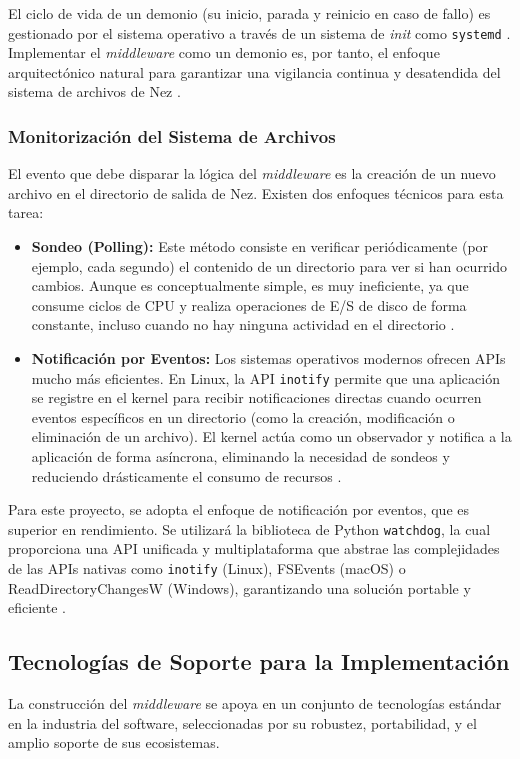 El ciclo de vida de un demonio (su inicio, parada y reinicio en caso de fallo) es gestionado por el sistema operativo a través de un sistema de \textit{init} como \texttt{systemd} \cite{stevens2013advanced}. Implementar el \textit{middleware} como un demonio es, por tanto, el enfoque arquitectónico natural para garantizar una vigilancia continua y desatendida del sistema de archivos de Nez \cite{sanders2005daemon}.

\subsubsection{Monitorización del Sistema de Archivos}
El evento que debe disparar la lógica del \textit{middleware} es la creación de un nuevo archivo en el directorio de salida de Nez. Existen dos enfoques técnicos para esta tarea:
\begin{itemize}
    \item \textbf{Sondeo (Polling):} Este método consiste en verificar periódicamente (por ejemplo, cada segundo) el contenido de un directorio para ver si han ocurrido cambios. Aunque es conceptualmente simple, es muy ineficiente, ya que consume ciclos de CPU y realiza operaciones de E/S de disco de forma constante, incluso cuando no hay ninguna actividad en el directorio \cite{kerrisk2010linux}.
    \item \textbf{Notificación por Eventos:} Los sistemas operativos modernos ofrecen APIs mucho más eficientes. En Linux, la API \texttt{inotify} permite que una aplicación se registre en el kernel para recibir notificaciones directas cuando ocurren eventos específicos en un directorio (como la creación, modificación o eliminación de un archivo). El kernel actúa como un observador y notifica a la aplicación de forma asíncrona, eliminando la necesidad de sondeos y reduciendo drásticamente el consumo de recursos \cite{love2005inotify}.
\end{itemize}
Para este proyecto, se adopta el enfoque de notificación por eventos, que es superior en rendimiento. Se utilizará la biblioteca de Python \texttt{watchdog}, la cual proporciona una API unificada y multiplataforma que abstrae las complejidades de las APIs nativas como \texttt{inotify} (Linux), FSEvents (macOS) o ReadDirectoryChangesW (Windows), garantizando una solución portable y eficiente \cite{watchdog2023docs}.

\subsection{Tecnologías de Soporte para la Implementación}
La construcción del \textit{middleware} se apoya en un conjunto de tecnologías estándar en la industria del software, seleccionadas por su robustez, portabilidad, y el amplio soporte de sus ecosistemas.

